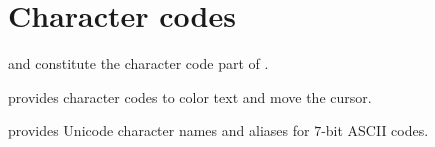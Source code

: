 %                                                                        
%                                                                        
%                                                                        
%                                                                        
%
\clearpage
\section{Character codes}

 and
constitute the character code part of \projectname.

 provides character codes to color text and move the cursor.


 provides Unicode \cite{Unicode} character names and aliases for $7$-bit ASCII codes.
\pagebreak
{}


